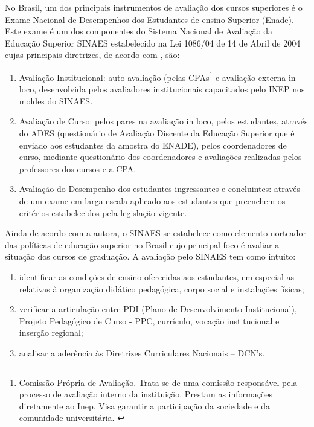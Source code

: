 

No Brasil, um dos principais instrumentos de avaliação dos cursos superiores é o Exame Nacional de Desempenhos dos Estudantes de ensino Superior (Enade). Este exame é um dos componentes do Sistema Nacional de Avaliação da Educação Superior SINAES estabelecido na Lei 1086/04 de 14 de Abril de 2004 cujas principais diretrizes, de acordo com , são:
\begin{enumerate}[label=\roman*)]
\item Avaliação Institucional: auto-avaliação (pelas CPAs\footnote{Comissão Própria de Avaliação. Trata-se de uma comissão responsável pela processo de avaliação interno da instituição. Prestam as informações diretamente ao Inep. Visa garantir a participação da sociedade e da comunidade universitária. \cite[p.~26]{INEP_2018}} e avaliação externa in loco, desenvolvida pelos avaliadores institucionais capacitados pelo INEP nos moldes do SINAES.
\item Avaliação de Curso: pelos pares na avaliação in loco, pelos estudantes, através do ADES (questionário de Avaliação Discente da Educação Superior que é enviado aos estudantes da amostra do ENADE), pelos coordenadores de curso, mediante questionário dos coordenadores e avaliações realizadas pelos professores dos cursos e a CPA.
\item Avaliação do Desempenho dos estudantes ingressantes e concluintes: através de um exame em larga escala aplicado aos estudantes que preenchem os critérios estabelecidos pela legislação vigente.
\end{enumerate}
Ainda de acordo com a autora, o SINAES se estabelece como elemento norteador das políticas de educação superior no Brasil cujo principal foco é avaliar a situação dos cursos de graduação. A avaliação pelo SINAES tem como intuito: 
\begin{enumerate}[label=\roman*)]
\item identificar as condições de ensino oferecidas aos estudantes, em especial as relativas à organização didático pedagógica, corpo social e instalações físicas;
\item verificar a articulação entre PDI (Plano de Desenvolvimento Institucional), Projeto Pedagógico de Curso - PPC, currículo, vocação institucional e inserção regional;
\item analisar a aderência às Diretrizes Curriculares Nacionais – DCN’s.
\end{enumerate}

